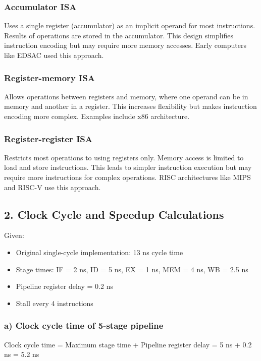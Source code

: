 \documentclass[12pt]{article}
\begin{document}
\subsubsection*{Accumulator ISA}
Uses a single register (accumulator) as an implicit operand for most instructions. Results of operations are stored in the accumulator. This design simplifies instruction encoding but may require more memory accesses. Early computers like EDSAC used this approach.

\subsubsection*{Register-memory ISA}
Allows operations between registers and memory, where one operand can be in memory and another in a register. This increases flexibility but makes instruction encoding more complex. Examples include x86 architecture.

\subsubsection*{Register-register ISA}
Restricts most operations to using registers only. Memory access is limited to load and store instructions. This leads to simpler instruction execution but may require more instructions for complex operations. RISC architectures like MIPS and RISC-V use this approach.

\subsection*{2. Clock Cycle and Speedup Calculations}

Given:
\begin{itemize}
    \item Original single-cycle implementation: 13 ns cycle time
    \item Stage times: IF = 2 ns, ID = 5 ns, EX = 1 ns, MEM = 4 ns, WB = 2.5 ns
    \item Pipeline register delay = 0.2 ns
    \item Stall every 4 instructions
\end{itemize}

\subsubsection*{a) Clock cycle time of 5-stage pipeline}
Clock cycle time = Maximum stage time + Pipeline register delay
= 5 ns + 0.2 ns = 5.2 ns
\end{document}
